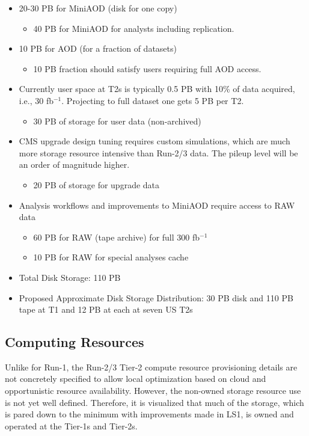 \begin{itemize}
\item 20-30 PB for MiniAOD (disk for one copy)
\begin{itemize}
\item 40 PB for MiniAOD for analysts including replication.
\end{itemize}
\item 10 PB for AOD (for a fraction of datasets)
\begin{itemize}
\item 10 PB fraction should satisfy users requiring full AOD access.
\end{itemize}
\item Currently user space at T2s is typically 0.5 PB with 10\% of data acquired, i.e., 30 fb$^{-1}$.
Projecting to full dataset one gets 5 PB per T2.
\begin{itemize} 
\item 30 PB of storage for user data (non-archived)
\end{itemize}
\item CMS upgrade design tuning requires custom simulations, which are much more
storage resource intensive than Run-2/3 data.  The pileup level will be an order of
magnitude higher.
\begin{itemize} 
\item 20 PB of storage for upgrade data
\end{itemize} 
\item Analysis workflows and improvements to MiniAOD require access to RAW data
\begin{itemize}
\item 60 PB for RAW (tape archive) for full 300 fb$^{-1}$
\end{itemize} 
\begin{itemize}
\item 10 PB for RAW for special analyses cache
\end{itemize}
\item Total Disk Storage:  110 PB
\item Proposed Approximate Disk Storage Distribution: 30 PB disk and 110 PB tape at T1 and 12 PB at each at seven US T2s
\end{itemize}

\subsection{Computing Resources}

Unlike for Run-1, the Run-2/3 Tier-2 compute resource provisioning details are not 
concretely specified to allow local optimization based on cloud and opportunistic
resource availability. However, the non-owned storage resource use is not yet
well defined. Therefore, it is visualized that much of the storage, which is pared 
down to the minimum with improvements made in LS1, is owned and operated at 
the Tier-1s and Tier-2s. 

